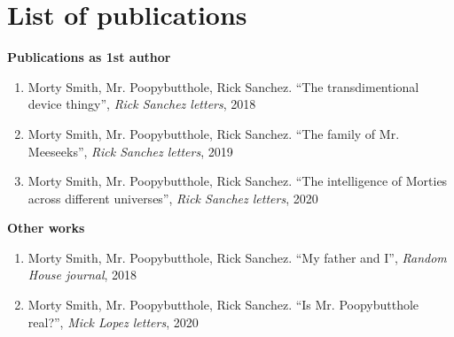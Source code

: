 \chapter*{List of publications}
\noindent \textbf{Publications as 1st author}
\begin{enumerate}
\item Morty Smith, Mr. Poopybutthole, Rick Sanchez. ``The transdimentional device thingy'', \textit{Rick Sanchez letters}, 2018
\item Morty Smith, Mr. Poopybutthole, Rick Sanchez. ``The family of Mr. Meeseeks'', \textit{Rick Sanchez letters}, 2019
\item Morty Smith, Mr. Poopybutthole, Rick Sanchez. ``The intelligence of Morties across different universes'', \textit{Rick Sanchez letters}, 2020
\end{enumerate}

\noindent \textbf{Other works}
\begin{enumerate}
\item Morty Smith, Mr. Poopybutthole, Rick Sanchez. ``My father and I'', \textit{Random House journal}, 2018
\item Morty Smith, Mr. Poopybutthole, Rick Sanchez. ``Is Mr. Poopybutthole real?'', \textit{Mick Lopez letters}, 2020
\end{enumerate}